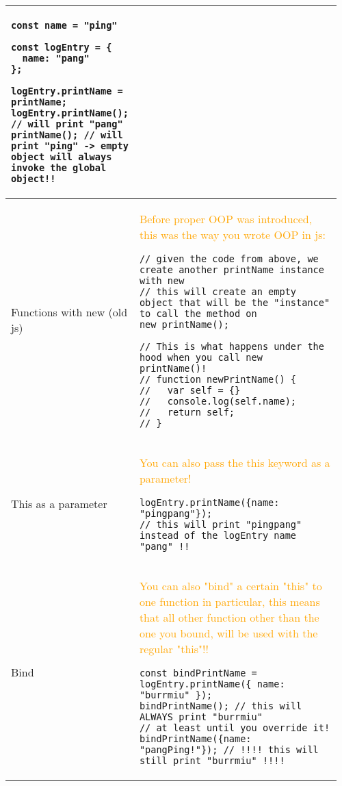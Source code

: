 \documentclass[main.tex,fontsize=8pt,paper=a4,paper=portrait,DIV=calc,]{scrartcl}
\begin{document}
\begin{table}[ht!]
\begin{tabular}{|m{0.2\linewidth}|m{0.755\linewidth}|}
\begin{lstlisting}
const name = "ping"

const logEntry = {
  name: "pang"
};

logEntry.printName = printName;
logEntry.printName(); // will print "pang"
printName(); // will print "ping" -> empty object will always invoke the global object!!
\end{lstlisting}\\
\hline
Functions with new (old js) & 
\textcolor{orange}{Before proper OOP was introduced, this was the way you wrote OOP in js:}\newline
\begin{lstlisting}
// given the code from above, we create another printName instance with new
// this will create an empty object that will be the "instance" to call the method on
new printName();

// This is what happens under the hood when you call new printName()!
// function newPrintName() {
//   var self = {}
//   console.log(self.name);
//   return self;
// }
\end{lstlisting}\\
\hline
This as a parameter & 
\textcolor{orange}{You can also pass the this keyword as a parameter!}\newline
\begin{lstlisting}
logEntry.printName({name: "pingpang"});
// this will print "pingpang" instead of the logEntry name "pang" !!
\end{lstlisting}\\
\hline
Bind & 
\textcolor{orange}{You can also "bind" a certain "this" to one function in particular, this means that all other function other than the one you bound, will be used with the regular "this"!!}\newline
\begin{lstlisting}
const bindPrintName = logEntry.printName({ name: "burrmiu" });
bindPrintName(); // this will ALWAYS print "burrmiu"
// at least until you override it!
bindPrintName({name: "pangPing!"}); // !!!! this will still print "burrmiu" !!!!
\end{lstlisting}\\
\hline
\end{tabular}

\end{table}
\end{document}
